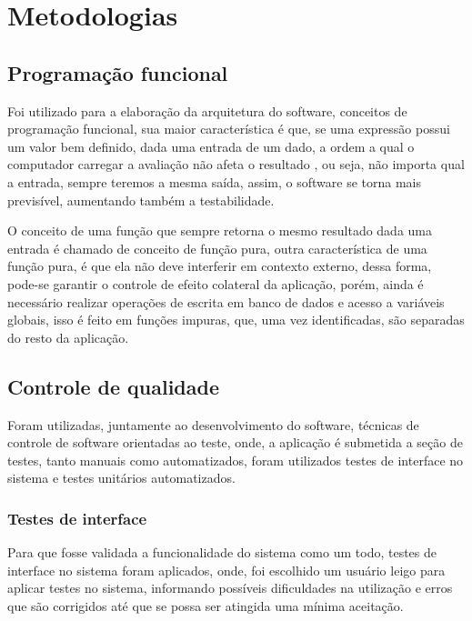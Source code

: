 \chapter{Metodologias}

\section{Programação funcional}

Foi utilizado para a elaboração da arquitetura do software, conceitos de programação funcional, sua maior característica é que, se uma expressão possui um valor bem definido, dada uma entrada de um dado, a ordem a qual o computador carregar a avaliação não afeta o resultado \cite{introduction_functional}, ou seja, não importa qual a entrada, sempre teremos a mesma saída, assim, o software se torna mais previsível, aumentando também a testabilidade.

O conceito de uma função que sempre retorna o mesmo resultado dada uma entrada é chamado de conceito de função pura, outra característica de uma função pura, é que ela não deve interferir em contexto externo, dessa forma, pode-se garantir o controle de efeito colateral da aplicação, porém, ainda é necessário realizar operações de escrita em banco de dados e acesso a variáveis globais, isso é feito em funções impuras, que, uma vez identificadas, são separadas do resto da aplicação.

\section{Controle de qualidade}

Foram utilizadas, juntamente ao desenvolvimento do software, técnicas de controle de software orientadas ao teste, onde, a aplicação é submetida a seção de testes, tanto manuais como automatizados, foram utilizados testes de interface no sistema e testes unitários automatizados.

\subsection{Testes de interface}

Para que fosse validada a funcionalidade do sistema como um todo, testes de interface no sistema foram aplicados, onde, foi escolhido um usuário leigo para aplicar testes no sistema, informando possíveis dificuldades na utilização e erros que são corrigidos até que se possa ser atingida uma mínima aceitação.

